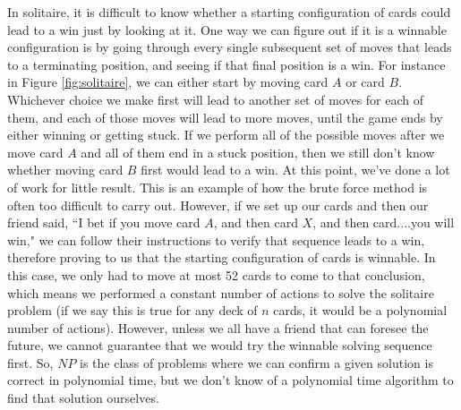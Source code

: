 In solitaire, it is
difficult to know whether a starting configuration of cards could lead to a win
just by looking at it. One way we can figure out if it is a winnable
configuration is by going through every single subsequent set of moves that
leads to a terminating position, and seeing if that final position is a win. For
instance in Figure \ref{fig:solitaire}, we can either start by moving card $A$
or card $B$.
Whichever choice we make first will lead to another set of moves for each of them,
and each of those moves will lead to more moves, until the game ends by either
winning or getting stuck. If we perform all of the possible moves after we move
card $A$ and all of them end in a stuck position, then we still don't know whether
moving card $B$ first would lead to a win. At this point, we've done a lot of
work for little
result. This is an example of how the brute force method is often too difficult
to carry out. However, if we set up our cards and then our friend said, ``I bet
if you move card $A$, and then card $X$, and then card....you will win," we can
follow their instructions to verify that sequence leads to a win, therefore
proving to us that the starting configuration of cards is winnable. In this
case, we only had
to move at most 52 cards to come to that conclusion, which means we performed a
constant number of actions to solve the solitaire problem (if we say this is
true for any deck of
$n$ cards, it would be a polynomial number of actions). However, unless we all
have a friend that can foresee the future, we cannot guarantee that we would try
the winnable solving sequence first. So, $NP$ is the class of problems where we can
confirm a given solution is correct in polynomial time, but we don't know of a
polynomial time algorithm to find that solution ourselves. 


